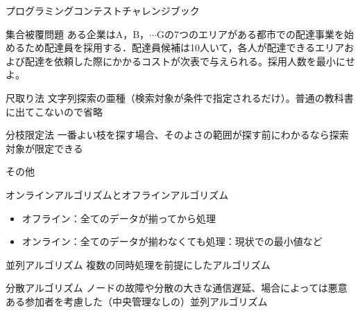 \documentclass{beamer}
\begin{document}
\begin{frame}[fragile]{プログラミングコンテストチャレンジブック}{}
\begin{block}{集合被覆問題}
ある企業はA，B，$\cdots$Gの7つのエリアがある都市での配達事業を始めるため配達員を採用する．配達員候補は10人いて，各人が配達できるエリアおよび配達を依頼した際にかかるコストが次表で与えられる。採用人数を最小にせよ。
\end{block}

\begin{block}{尺取り法}
文字列探索の亜種（検索対象が条件で指定されるだけ）。普通の教科書に出てこないので省略
\end{block}

\begin{block}{分枝限定法}
一番よい枝を探す場合、そのよさの範囲が探す前にわかるなら探索対象が限定できる
\end{block}
\end{frame}

\begin{frame}[fragile]{その他}{}

\begin{block}{オンラインアルゴリズムとオフラインアルゴリズム}
\begin{itemize}%
\item オフライン：全てのデータが揃ってから処理
\item オンライン：全てのデータが揃わなくても処理：現状での最小値など
\end{itemize}
\end{block}

\begin{block}{並列アルゴリズム}
複数の同時処理を前提にしたアルゴリズム
\end{block}

\begin{block}{分散アルゴリズム}
ノードの故障や分散の大きな通信遅延、場合によっては悪意ある参加者を考慮した（中央管理なしの）並列アルゴリズム
\end{block}
\end{frame}
\end{document}
